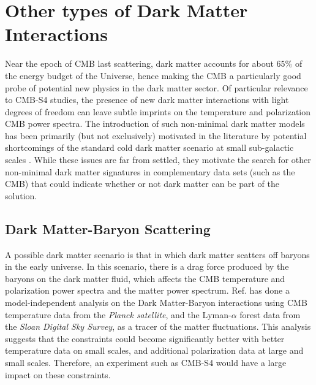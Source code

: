\section{Other types of Dark Matter Interactions}
%
Near the epoch of CMB last scattering, dark matter accounts for about $65\%$ of the energy budget of the Universe, hence making the CMB a particularly good probe of potential new physics in the dark matter sector. Of particular relevance to CMB-S4 studies, the presence of new dark matter interactions with light degrees of freedom \cite{Goldberg:1986nk,Carlson:1992fn,Gradwohl:1992ue,Machacek:1994vg,deLaix:1995vi,AtrioBarandela:1996ur,Boehm:2001hm,Foot:2004pa,Green:2005fa,Profumo:2006bv,Mangano:2006mp,Ackerman:2008gi,ArkaniHamed:2008qn,Feng:2009mn,Serra:2009uu,Bringmann:2009vf,Kaplan:2009de,McDermott:2010pa,Kaplan:2011yj,Aarssen:2012fx,Diamanti:2012tg,Baldi:2012ua,Cline:2012is,CyrRacine:2012fz,Fan:2013yva,Fan:2013tia,Cyr-Racine:2013fsa,Bringmann:2013vra,Wilkinson:2013kia,Dvorkin:2013cea,Boehm:2014vja,Wilkinson:2014ksa,Escudero:2015yka,Chu:2014lja,Archidiacono:2014nda,Buen-Abad:2015ova,Lesgourgues:2015wza} can leave subtle imprints on the temperature and polarization CMB power spectra. The introduction of such non-minimal dark matter models has been primarily (but not exclusively) motivated in the literature by potential shortcomings of the standard cold dark matter scenario at small sub-galactic scales \cite{deBlok:1997zlw,Klypin:1999uc,Moore:1999nt,Zavala:2009ms,Oh:2010ea,BoylanKolchin:2011de,Papastergis:2011xe,Walker:2011zu,Pawlowski:2013kpa,Klypin:2014ira,Oman:2015xda,Papastergis:2014aba}. While these issues are far from settled, they motivate the search for other non-minimal dark matter signatures in complementary data sets (such as the CMB) that could indicate whether or not dark matter can be part of the solution. 

\subsection{Dark Matter-Baryon Scattering}

A possible dark matter scenario is that in which dark matter scatters off baryons in the early universe. 
In this scenario, there is a drag force produced by the baryons on the dark matter fluid, which affects the CMB temperature and polarization power spectra and the matter power spectrum.
Ref. \cite{Dvorkin:2013cea} has done a model-independent analysis on the Dark Matter-Baryon interactions using CMB temperature data from the {\it Planck satellite}, and the Lyman-$\alpha$ forest data from the {\it Sloan Digital Sky Survey}, as a tracer of the matter fluctuations. This analysis suggests that the constraints could become significantly better with better temperature data on small scales, and additional polarization data at large and small scales. Therefore, an experiment such as CMB-S4 would have a large impact on these constraints.

